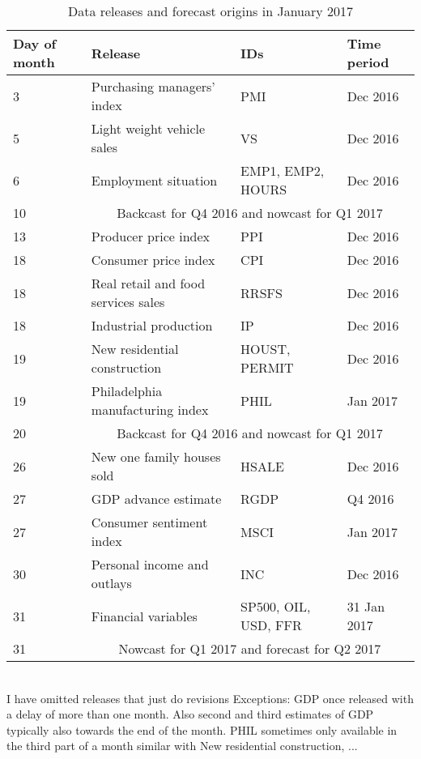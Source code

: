 \begin{table}
	\label{tbl:release_pattern}
	\caption{Data releases and forecast origins in January 2017}
	\begin{tabular}{|l|l|l|l|}
		\hline
		Day of month  & Release                            & IDs               & Time period \\
		\hline
		3 & Purchasing managers' index         & PMI               & Dec 2016 \\
		5 & Light weight vehicle sales         & VS                & Dec 2016 \\
		6 & Employment situation               & EMP1, EMP2, HOURS & Dec 2016 \\
		\hline 
		10 & \multicolumn{3}{|c|}{Backcast for Q4 2016 and nowcast for Q1 2017}                    \\            
		\hline
		13 & Producer price index               & PPI               & Dec 2016 \\
		18 & Consumer price index               & CPI               & Dec 2016 \\
		18 & Real retail and food services sales& RRSFS             & Dec 2016 \\
		18 & Industrial production              & IP                & Dec 2016 \\
		19 & New residential construction       & HOUST, PERMIT     & Dec 2016 \\
		19 & Philadelphia manufacturing index   & PHIL              & Jan 2017 \\
		\hline 
		20 & \multicolumn{3}{|c|}{Backcast for Q4 2016 and nowcast for Q1 2017}            \\            
		\hline
		26 & New one family houses sold         & HSALE             & Dec 2016 \\
		27 & GDP advance estimate               & RGDP              & Q4 2016  \\
		27 & Consumer sentiment index          & MSCI              & Jan 2017 \\
		30 & Personal income and outlays        & INC               & Dec 2016 \\
		31 & Financial variables                & SP500, OIL, USD, FFR & 31 Jan 2017  \\
		\hline
		31 & \multicolumn{3}{|c|}{Nowcast for Q1 2017 and forecast for Q2 2017}                 \\
		\hline
	\end{tabular}
	\vspace{0.0cm}\\
	I have omitted releases that just do revisions
	Exceptions: GDP once released with a delay of more than one month. Also second and third estimates of GDP typically also towards the end of the month.
	PHIL sometimes only available in the third part of a month
	similar with New residential construction, ...
\end{table}

